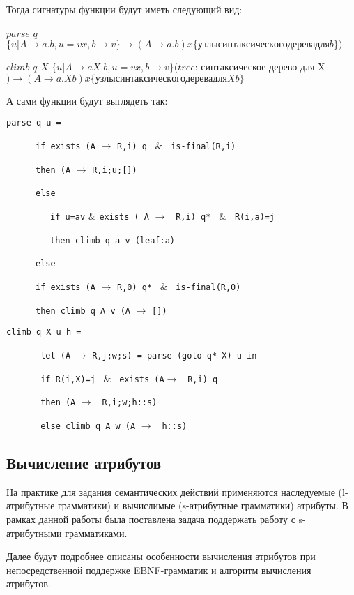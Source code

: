 Тогда сигнатуры функции будут иметь следующий вид:

$parse$ $ q $ $ \{ u | A \rightarrow a.b, u = vx, b \rightarrow v \} \rightarrow (A \rightarrow a.b) x \{узлы синтаксического дерева для b \})$

$climb$ $q$ $X$ $\{ u | A \rightarrow aX.b, u = vx, b \rightarrow v \} (tree $: синтаксическое дерево для X$) \rightarrow (A \rightarrow a.Xb) x \{узлы синтаксического дерева для Xb\}$

А сами функции будут выглядеть так:

\verb|parse q u =|

\ \ \ \ \ \  \verb|if exists (A| $\rightarrow$ \verb|R,i) q| \ $\&$ \ \verb|is-final(R,i)| 
  
\ \ \ \ \ \  \verb|then (A| $\rightarrow$ \verb|R,i;u;[])|

\ \ \ \ \ \  \verb|else|

\ \ \ \ \ \ \ \ \ \verb|if u=av| $\&$ \verb|exists ( A| $\rightarrow$ \verb| R,i) q* | $\&$ \verb| R(i,a)=j| 
     
\ \ \ \ \ \ \ \ \ \verb|then climb q a v (leaf:a)|
     
\ \ \ \ \ \  \verb|else|
     
\ \ \ \ \ \  \verb|if exists (A| $\rightarrow$ \verb|R,0) q*| \ $\&$ \ \verb|is-final(R,0)| 
        
        
\ \ \ \ \ \  \verb|then climb q A v (A| $\rightarrow$ \verb|[])|
        
\verb|climb q X u h = |

  \ \ \ \ \ \ \verb| let (A| $\rightarrow$ \verb|R,j;w;s) = parse (goto q* X) u in|
  
  \ \ \ \ \ \ \verb| if R(i,X)=j| \ $\&$ \ \verb|exists (A|$\rightarrow$ \verb| R,i) q| 
  
  \ \ \ \ \ \ \verb| then (A| $\rightarrow$ \verb| R,i;w;h::s)|
   
  \ \ \ \ \ \ \verb| else climb q A w (A| $\rightarrow$ \verb| h::s)|


\subsection{Вычисление атрибутов}

На практике для задания семантических действий применяются наследуемые (l-атрибутные грамматики) и вычислимые (s-атрибутные грамматики) атрибуты. В рамках данной работы была поставлена задача поддержать работу с s-атрибутными грамматиками.

Далее будут подробнее описаны особенности вычисления атрибутов при непосредственной поддержке EBNF-грамматик и алгоритм вычисления атрибутов.


